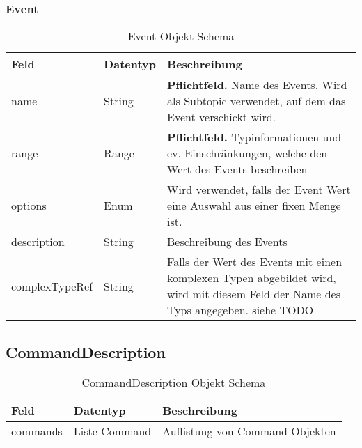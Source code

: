 \subsubsection{Event}
\begin{table}[h!]
\begin{tabularx}{\textwidth}{|l|l|X|}

 \hline
 {\bf Feld } & {\bf Datentyp } & {\bf Beschreibung } \\  \hline
 
 name  &   String   &  \textbf{Pflichtfeld.} Name des Events. Wird als Subtopic verwendet, auf dem das Event verschickt wird. \\ \hline
 range  &   Range   &  \textbf{Pflichtfeld.} Typinformationen und ev. Einschränkungen, welche den Wert des Events beschreiben   \\ \hline
 options  &   Enum   &  Wird verwendet, falls der Event Wert eine Auswahl aus einer fixen Menge ist.  \\ \hline
 description  &   String   &  Beschreibung des Events  \\ \hline
 complexTypeRef  &   String   &  Falls der Wert des Events mit einen komplexen Typen abgebildet wird, wird mit diesem Feld der Name des Typs angegeben. siehe TODO  \\ \hline

\end{tabularx}
\caption{Event Objekt Schema}
\end{table}



\subsection{CommandDescription}
\begin{table}[h!]
\begin{tabularx}{\textwidth}{|l|l|X|}

 \hline
 {\bf Feld } & {\bf Datentyp } & {\bf Beschreibung } \\  \hline
 commands  &   Liste Command   & Auflistung von Command Objekten   \\ \hline

\end{tabularx}
\caption{CommandDescription Objekt Schema}
\end{table}


